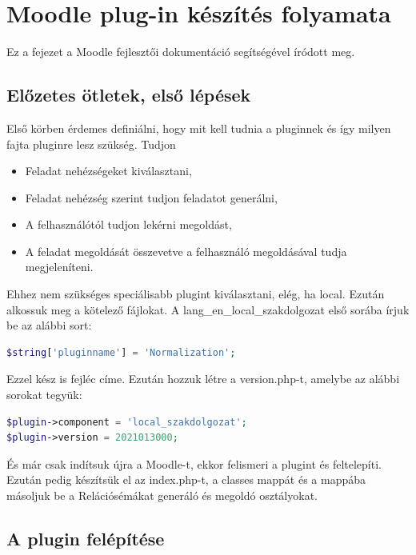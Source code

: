 \chapter{Moodle plug-in készítés folyamata}

Ez a fejezet a \cite{MoodleTutorial} Moodle fejlesztői dokumentáció segítségével íródott meg.

\section{Előzetes ötletek, első lépések}

Első körben érdemes definiálni, hogy mit kell tudnia a pluginnek és így milyen fajta pluginre lesz szükség. Tudjon
\begin{itemize}
    \item Feladat nehézségeket kiválasztani,
    \item Feladat nehézség szerint tudjon feladatot generálni,
    \item A felhasználótól tudjon lekérni megoldást,
    \item A feladat megoldását összevetve a felhasználó megoldásával tudja megjeleníteni.
\end{itemize}

Ehhez nem szükséges speciálisabb plugint kiválasztani, elég, ha local. Ezután alkossuk meg a kötelező fájlokat. A lang\_en\_local\_szakdolgozat első sorába írjuk be az alábbi sort:

\begin{lstlisting}[language=php]
$string['pluginname'] = 'Normalization';
\end{lstlisting}

Ezzel kész is fejléc címe. Ezután hozzuk létre a version.php-t, amelybe az alábbi sorokat tegyük:

\begin{lstlisting}[language=php]
$plugin->component = 'local_szakdolgozat';
$plugin->version = 2021013000;
\end{lstlisting}

És már csak indítsuk újra a Moodle-t, ekkor felismeri a plugint és feltelepíti. Ezután pedig készítsük el az index.php-t, a classes mappát és a mappába másoljuk be a Relációsémákat generáló és megoldó osztályokat.

\section{A plugin felépítése}

